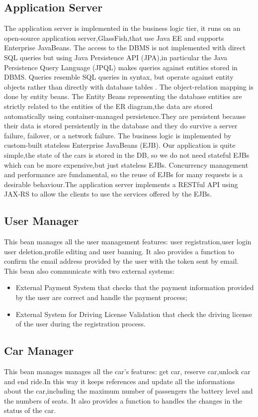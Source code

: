 \subsection{Application Server}
The application server is implemented in the business logic tier, it runs on an open-source application server,GlassFish,that use Java EE and supports Enterprise JavaBeans. The access to the DBMS is not implemented with direct SQL queries but using Java Persistence API (JPA),in particular the Java Persistence Query Language (JPQL) makes queries against entities stored in DBMS. Queries resemble SQL queries in syntax, but operate against entity objects rather than directly with database tables . The object-relation mapping is done by entity beans. The Entity Beans representing the database entities are strictly related to the entities of the ER diagram,the data  are stored automatically using container-managed persistence.They are persistent because their data is stored persistently in the database and they do survive a server failure, failover, or a network failure. The business logic is implemented by custom-built stateless Enterprise JavaBeans (EJB). Our application is quite simple,the state of the cars is stored in the DB, so we do not need stateful EJBs which can be more expensive,but just stateless EJBs. Concurrency management and performance are fundamental, so the reuse of EJBs for many requests is a desirable behaviour.The application server implements a RESTful API using JAX-RS to allow the clients to use the services offered by the EJBs.

\subsection{User Manager}
This bean manages all the user management features: user registration,user login user deletion,profile editing and user banning. It also provides a function to confirm the email address provided by the user with the token sent by email. This bean also communicate with two external systems:
\begin{itemize}
\item External Payment System that checks that the payment information provided by the user are correct and handle the payment process;
\item  External System for Driving License Validation that check the driving license of the user during the registration process.
\end{itemize}

\subsection{Car Manager}
This bean manages manages all the car's features: get car, reserve car,unlock car and end ride.In this way it keeps references and update all the informations about the car,including the maximum number of passengers the battery level and the numbers of seats. It also provides a function to handles the changes in the status of the car.

